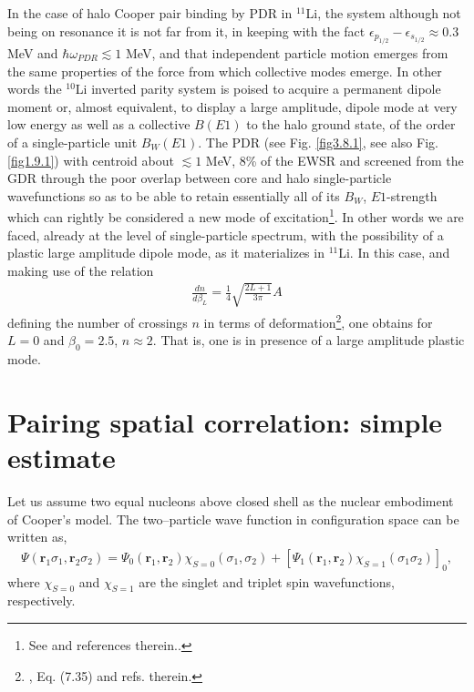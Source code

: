 In the case of halo Cooper pair binding by PDR in $^{11}$Li, the system although not being on resonance it is not far from it, in keeping with the fact $\epsilon_{p_{1/2}}-\epsilon_{s_{1/2}}\approx 0.3$ MeV and $\hbar\omega_{PDR}\lesssim1$ MeV, and that independent particle motion emerges from the same properties of the force from which collective modes emerge. In other words the $^{10}$Li inverted parity system is poised to acquire a permanent dipole moment or, almost equivalent, to display a large amplitude, dipole mode at very low energy as well as a collective $B(E1)$ to the halo ground state, of the order of a single-particle unit $B_{W}(E1)$. The PDR (see Fig. \ref{fig3.8.1}, see also Fig. \ref{fig1.9.1}) with centroid about $\lesssim 1$ MeV, 8\% of the EWSR and  screened from the GDR through the poor overlap between core and halo single-particle wavefunctions so as to be able to retain essentially all of its $B_{W}$, $E1$-strength which can rightly be considered a new mode of excitation\footnote{See \cite{Broglia:19} and references therein..}. In other words we are faced, already at the level of single-particle spectrum, with the possibility of a plastic large amplitude dipole mode, as it materializes in $^{11}$Li. In this case, and making use of the relation 
\begin{align}\label{eq3C6}
\frac{dn}{d\beta_L}=\frac{1}{4}\sqrt{\frac{2L+1}{3\pi}}A
\end{align}  
defining the number of crossings $n$ in terms of deformation\footnote{\cite{Brink:05}, Eq. (7.35) and refs. therein.}, one obtains for $L=0$ and $\beta_0=2.5$, $n\approx 2$. That is, one is in presence of a large amplitude plastic mode.
\section{Pairing spatial correlation: simple estimate}\label{app3D}
Let us assume two equal nucleons above closed shell as the nuclear embodiment of Cooper's model. The two--particle wave function in configuration space can be written as,
\begin{align}\label{eq1App3E}
\Psi(\mathbf r_1\sigma_1,\mathbf r_2\sigma_2)=\Psi_0(\mathbf r_1,\mathbf r_2)\chi_{S=0}(\sigma_1,\sigma_2)+\left[\Psi_1(\mathbf r_1,\mathbf r_2)\chi_{S=1}(\sigma_1\sigma_2)\right]_0,
\end{align}
where $\chi_{S=0}$ and $\chi_{S=1}$ are the singlet and triplet spin wavefunctions, respectively.


